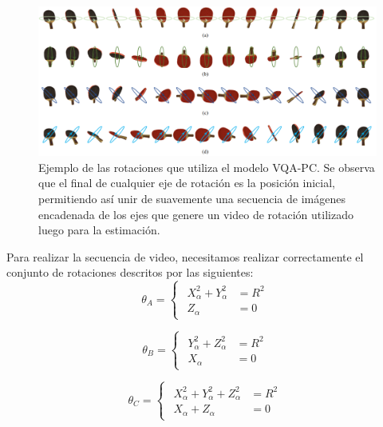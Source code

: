 \begin{figure}
  \begin{center}
    \includegraphics[width=\textwidth]{imagenes/chapter4/VQARotation}
  \end{center}
  \caption[Ejemplo de las rotaciones que utiliza el modelo VQA-PC\cite{VQA-PC}.]
  {Ejemplo de las rotaciones que utiliza el modelo VQA-PC\cite{VQA-PC}.
  Se observa que el final de cualquier eje de rotación es la posición inicial, 
permitiendo así unir de suavemente una secuencia de imágenes encadenada de los ejes 
que genere un video de rotación utilizado luego para la estimación.}
  \label{fig:VQARotation}
\end{figure}

Para realizar la secuencia de video, necesitamos realizar correctamente 
el conjunto de rotaciones descritos por las siguientes: 
\begin{equation}
  \theta_A = 
\begin{cases}
\begin{aligned}
   X_\alpha^2 + Y_\alpha^2 & = R^2 \\ 
    Z_\alpha & = 0 
\end{aligned}
\end{cases}
\label{eq:RotationA}
\end{equation}

\begin{equation}
  \theta_B = 
\begin{cases}
\begin{aligned}
   Y_\alpha^2 + Z_\alpha^2 & = R^2 \\ 
    X_\alpha & = 0 
\end{aligned}
\end{cases}
\label{eq:RotationB}
\end{equation}

\begin{equation}
  \theta_C = 
\begin{cases}
\begin{aligned}
   X_\alpha^2 + Y_\alpha^2 + Z_\alpha^2 & = R^2 \\ 
    X_\alpha + Z_\alpha & = 0 
\end{aligned}
\end{cases}
\label{eq:RotationC}
\end{equation}

